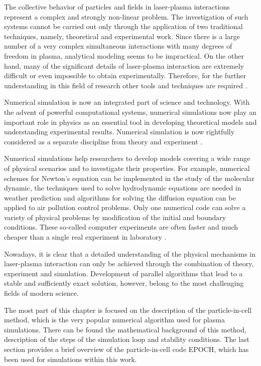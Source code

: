 The collective behavior of particles and fields in laser-plasma interactions represent a complex and strongly non-linear problem. The investigation of such systems cannot be carried out only through the application of two traditional techniques, namely, theoretical and experimental work. Since there is a large number of a very complex simultaneous interactions with many degrees of freedom in plasma, analytical modeling seems to be impractical. On the other hand, many of the significant details of laser-plasma interaction are extremely difficult or even impossible to obtain experimentally. Therefore, for the further understanding in this field of research other tools and techniques are required \cite{jaroszynsky}.

Numerical simulation is now an integrated part of science and technology. With the advent of powerful computational systems, numerical simulations now play an important role in physics as an essential tool in developing theoretical models and understanding experimental results. Numerical simulation is now rightfully considered as a separate discipline from theory and experiment \cite{pang}.

Numerical simulations help researchers to develop models covering a wide range of physical scenarios and to investigate their properties. For example, numerical schemes for Newton's equation can be implemented in the study of the molecular dynamic, the techniques used to solve hydrodynamic equations are needed in weather prediction and algorithms for solving the diffusion equation can be applied to air pollution control problems. Only one numerical code can solve a variety of physical problems by modification of the initial and boundary conditions. These so-called computer experiments are often faster and much cheaper than a single real experiment in laboratory \cite{gould}.
 
Nowadays, it is clear that a detailed understanding of the physical mechanisms in laser-plasma interaction can only be achieved through the combination of theory, experiment and simulation. Development of parallel algorithms that lead to a stable and sufficiently exact solution, however, belong to the most challenging fields of modern science.

The most part of this chapter is focused on the description of the particle-in-cell method, which is the very popular numerical algorithm used for plasma simulations. There can be found the mathematical background of this method, description of the steps of the simulation loop and stability conditions. The last section provides a brief overview of the particle-in-cell code EPOCH, which has been used for simulations within this work.